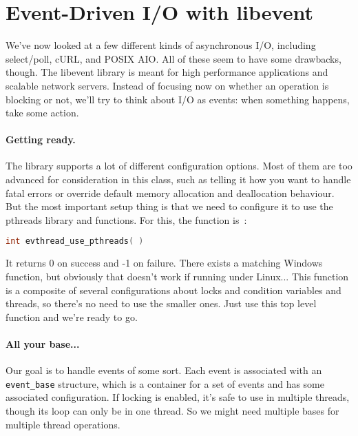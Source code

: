 




\section*{Event-Driven I/O with libevent}

We've now looked at a few different kinds of asynchronous I/O, including select/poll, cURL, and POSIX AIO. All of these seem to have some drawbacks, though. The libevent library is meant for high performance applications and scalable network servers. Instead of focusing now on whether an operation is blocking or not, we'll try to think about I/O as events: when something happens, take some action.

\paragraph{Getting ready.} The library supports a lot of different configuration options. Most of them are too advanced for consideration in this class, such as telling it how you want to handle fatal errors or override default memory allocation and deallocation behaviour. But the most important setup thing is that we need to configure it to use the pthreads library and functions. For this, the function is~\cite{libevent}:

\begin{lstlisting}[language=C]
int evthread_use_pthreads( )
\end{lstlisting}

It returns 0 on success and -1 on failure. There exists a matching Windows function, but obviously that doesn't work if running under Linux... This function is a composite of several configurations about locks and condition variables and threads, so there's no need to use the smaller ones. Just use this top level function and we're ready to go.

\paragraph{All your base...} Our goal is to handle events of some sort. Each event is associated with an \texttt{event\_base} structure, which is a container for a set of events and has some associated configuration. If locking is enabled, it's safe to use in multiple threads, though its loop can only be in one thread. So we might need multiple bases for multiple thread operations.

